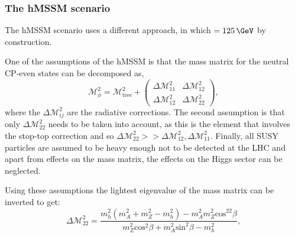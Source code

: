 \subsubsection{The hMSSM scenario}
\label{sec:theory_BSM_models_hMSSM}
The hMSSM scenario \cite{hMSSM-1,hMSSM-2} uses a different approach, in
which \mh$=125\,\GeV$ by construction. 

One of the assumptions of the hMSSM is that 
the mass matrix for the neutral CP-even states can
be decomposed as,
\begin{equation}
\label{eqn:hmssm_massmatrix}
\mathcal{M}^2_{\phi} = \mathcal{M}^2_{\text{tree}} + \begin{pmatrix}
\Delta\mathcal{M}^2_{11} & \Delta\mathcal{M}^2_{12} \\
\Delta\mathcal{M}^2_{12} & \Delta\mathcal{M}^2_{22} \end{pmatrix},
\end{equation}
where the $\Delta\mathcal{M}^2_{ij}$ are the radiative corrections.
The second assumption is that only $\Delta\mathcal{M}^2_{22}$ needs to be
taken into account, as this is the element that involves the stop-top correction
and so $\Delta\mathcal{M}^2_{22} >> \Delta\mathcal{M}^2_{12},\Delta\mathcal{M}^2_{11}$. 
Finally, all SUSY particles are assumed to be heavy enough not to be
detected at the \acs{LHC} and apart from effects on the mass matrix, 
the effects on the Higgs sector can be neglected.

Using these assumptions the lightest eigenvalue
of the mass matrix can be inverted to get: 
\begin{equation}
\label{eqn:hmssm_deltam22}
\Delta\mathcal{M}^2_{22} = \frac{m_h^2(m_A^2+m_Z^2 - m_h^2) - m_A^2m_Z^2\text{cos}^22\beta}{m_Z^2\text{cos}^2\beta + m_A^2\text{sin}^2\beta - m_h^2},
\end{equation}


